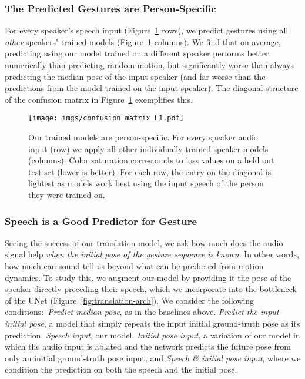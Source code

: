 \documentclass[10pt,twocolumn,letterpaper]{article}
\newcommand{\fig}[1]{Figure~\ref{#1}}
\newcommand{\unet}{UNet}
\begin{document}
\subsubsection{The Predicted Gestures are Person-Specific}
For every speaker's speech input (Figure~\ref{fig:cross-person} rows), we predict gestures using all \emph{other} speakers' trained models (Figure~\ref{fig:cross-person} columns). We find that on average, predicting using our model trained on a different speaker performs better numerically than predicting random motion, but significantly worse than always predicting the median pose of the input speaker (and far worse than the predictions from the model trained on the input speaker). The diagonal structure of the confusion matrix in Figure~\ref{fig:cross-person} exemplifies this.

\begin{figure}
\centering
\texttt{[image: imgs/confusion\_matrix\_L1.pdf]}
\vspace{-2mm}
  \caption{Our trained models are person-specific. For every speaker audio input (row) we apply all other individually trained speaker models (columns). Color saturation corresponds to  loss values on a held out test set (lower is better). For each row, the entry on the diagonal is lightest as models work best using the input speech of the person they were trained on.}
\label{fig:cross-person}
\end{figure}


\subsubsection{Speech is a Good Predictor for Gesture}
Seeing the success of our translation model, we ask how much does the audio signal help {\em when the initial pose of the gesture sequence is known}. In other words, how much can sound tell us beyond what can be predicted from motion dynamics. To study this, we augment our model by providing it the pose of the speaker directly preceding their speech, which we incorporate into the bottleneck of the \unet{} (\fig{fig:translation-arch}). We consider the following conditions:~\textit{Predict median pose}, as in the baselines above. \textit{Predict the input initial pose}, a model that simply repeats the input initial ground-truth pose as its prediction. \textit{Speech input}, our model. \textit{Initial pose input}, a variation of our model in which the audio input is ablated and the network predicts the future pose from only an initial ground-truth pose input, and \textit{Speech \& initial pose input}, where we condition the prediction on both the speech and the initial pose.
\end{document}
